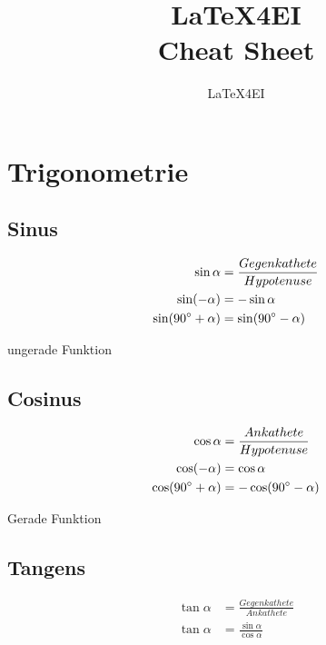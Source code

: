 \documentclass[english]{latex4ei/latex4ei_sheet}
\title{LaTeX4EI \\ Cheat Sheet}
\author{LaTeX4EI}					%
\begin{document}
\maketitle   %




\section{Trigonometrie}

\begin{sectionbox}
	\subsection{Sinus}
		\begin{emphbox}
			\begin{align*}
			 \sin \alpha &= \frac{Gegenkathete}{Hypotenuse} \\
			 \sin (-\alpha) &= -\sin \alpha \\
			 \sin (90 \degree + \alpha) &= \sin (90 \degree - \alpha)
			\end{align*}
		\end{emphbox}
		ungerade Funktion
	\subsection{Cosinus}
		\begin{emphbox}
			\begin{align*}
			\cos \alpha &= \frac{Ankathete}{Hypotenuse}\\
			\cos (-\alpha) &= \cos \alpha\\
			\cos (90 \degree + \alpha) &= -\cos (90 \degree - \alpha)
			\end{align*}
		\end{emphbox}
		Gerade Funktion

	\subsection{Tangens}
		\begin{emphbox}
			\begin{align*}
			\tan \alpha &= \frac{Gegenkathete}{Ankathete} \\
			\tan \alpha &= \frac{\sin \alpha}{\cos \alpha} 
			\end{align*}
		\end{emphbox}
		

\end{sectionbox}
\end{document}
